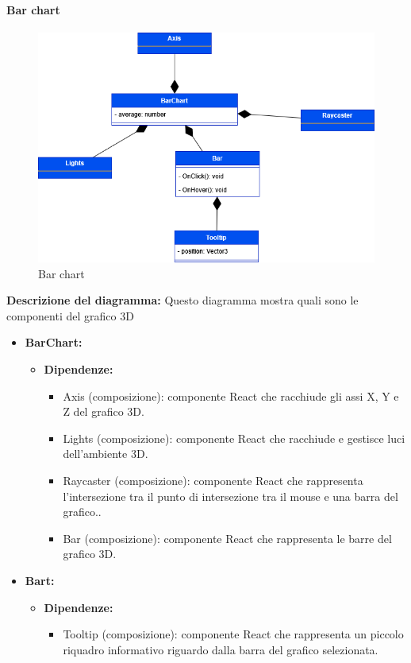 \paragraph{Bar chart}
\begin{figure}[h!] \centering
    \includegraphics[scale=0.45]{template/images/uml_front/ui/barchart.png}
    \caption{Bar chart}
\end{figure}
\textbf{Descrizione del diagramma:}
Questo diagramma mostra quali sono le componenti del grafico 3D
\begin{itemize}
    \item \textbf{BarChart:}
    \begin{itemize}
        \item \textbf{Dipendenze:}
        \begin{itemize}
            \item Axis (composizione): componente React che racchiude gli assi X, Y e Z del grafico 3D.
            \item Lights (composizione): componente React che racchiude e gestisce luci dell'ambiente 3D.
            \item Raycaster (composizione): componente React che rappresenta l'intersezione tra il punto di intersezione tra il mouse e una barra del grafico..
            \item Bar (composizione): componente React che rappresenta le barre del grafico 3D.
        \end{itemize} 
    \end{itemize}

    \item \textbf{Bart:}
    \begin{itemize}
        \item \textbf{Dipendenze:}
        \begin{itemize}
            \item Tooltip (composizione): componente React che rappresenta un piccolo riquadro informativo riguardo dalla barra del grafico selezionata.
        \end{itemize} 
    \end{itemize}
\end{itemize}

